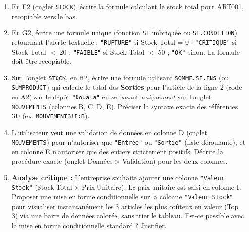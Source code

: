 \documentclass[11pt]{article}
\begin{document}
\begin{exercice}
\begin{enumerate}
    \item En F2 (onglet \texttt{STOCK}), écrire la formule calculant le stock total pour ART001, recopiable vers le bas.
    \item En G2, écrire une formule unique (fonction \texttt{SI} imbriquée ou \texttt{SI.CONDITION}) retournant l'alerte textuelle : \texttt{"RUPTURE"} si Stock Total = 0 ; \texttt{"CRITIQUE"} si Stock Total $<$ 20 ; \texttt{"FAIBLE"} si Stock Total $<$ 50 ; \texttt{"OK"} sinon. La formule doit être recopiable.
    \item Sur l'onglet \texttt{STOCK}, en H2, écrire une formule utilisant \texttt{SOMME.SI.ENS} (ou \texttt{SUMPRODUCT}) qui calcule le total des \textbf{Sorties} pour l'article de la ligne 2 (code en A2) sur le dépôt \texttt{"Douala"} en se basant \textit{uniquement} sur l'onglet \texttt{MOUVEMENTS} (colonnes B, C, D, E). Préciser la syntaxe exacte des références 3D (ex: \texttt{MOUVEMENTS!B:B}).
    \item L'utilisateur veut une validation de données en colonne D (onglet \texttt{MOUVEMENTS}) pour n'autoriser que \texttt{"Entrée"} ou \texttt{"Sortie"} (liste déroulante), et en colonne E n'autoriser que des entiers strictement positifs. Décrire la procédure exacte (onglet Données > Validation) pour les deux colonnes.
    \item \textbf{Analyse critique :} L'entreprise souhaite ajouter une colonne \texttt{"Valeur Stock"} (Stock Total $\times$ Prix Unitaire). Le prix unitaire est saisi en colonne I. Proposer une mise en forme conditionnelle sur la colonne \texttt{"Valeur Stock"} pour visualiser instantanément les 3 articles les plus coûteux en valeur (Top 3) via une barre de données colorée, sans trier le tableau. Est-ce possible avec la mise en forme conditionnelle standard ? Justifier.
\end{enumerate}
\end{exercice}
\end{document}
